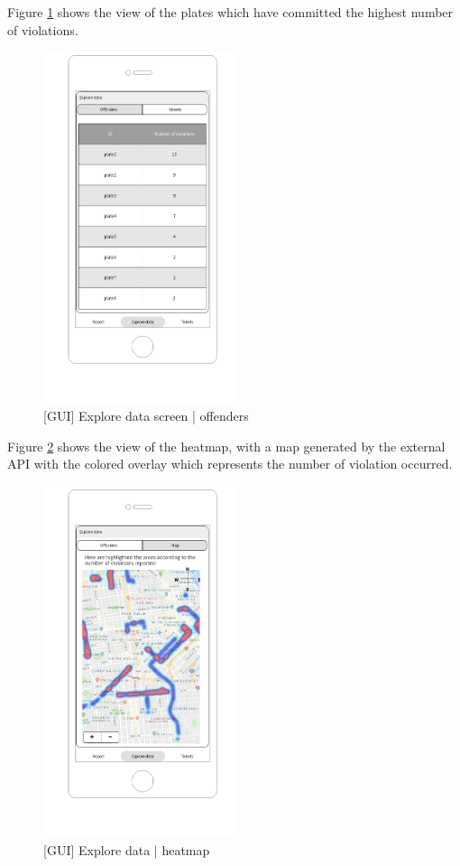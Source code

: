Figure \ref{fig:offenders} shows the view of the plates which have committed the highest number of violations.
\begin{figure}[H]
		\centering
      \includegraphics[width=0.5\textwidth]{GUI/offenders.png}
      \caption{[GUI] Explore data screen | offenders}   \label{fig:offenders}
\end{figure}

Figure \ref{fig:heatmap} shows the view of the heatmap, with a map generated by the external API with the colored overlay which represents the number of violation occurred.
\begin{figure}[H]
		\centering
      \includegraphics[width=0.5\textwidth]{GUI/heatmap.png}
      \caption{[GUI] Explore data | heatmap}   \label{fig:heatmap}
\end{figure}

